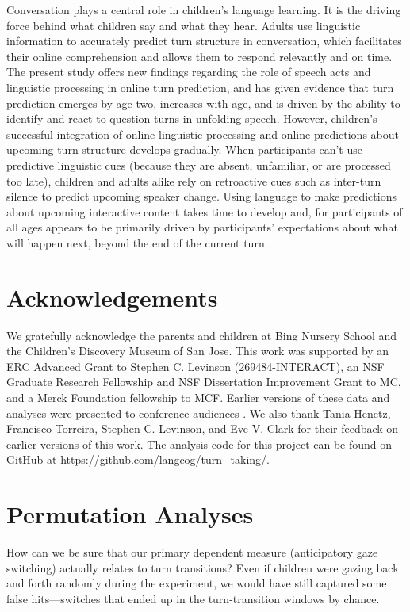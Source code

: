 \documentclass[authoryear, 12pt]{elsarticle}
\begin{document}
Conversation plays a central role in children's language learning. It is the driving force behind what children say and what they hear. Adults use linguistic information to accurately predict turn structure in conversation, which facilitates their online comprehension and allows them to respond relevantly and on time. The present study offers new findings regarding the role of speech acts and linguistic processing in online turn prediction, and has given evidence that turn prediction emerges by age two, increases with age, and is driven by the ability to identify and react to question turns in unfolding speech. However, children's successful integration of online linguistic processing and online predictions about upcoming turn structure develops gradually. When participants can't use predictive linguistic cues (because they are absent, unfamiliar, or are processed too late), children and adults alike rely on retroactive cues such as inter-turn silence to predict upcoming speaker change. Using language to make predictions about upcoming interactive content takes time to develop and, for participants of all ages appears to be primarily driven by participants' expectations about what will happen next, beyond the end of the current turn.

\section*{Acknowledgements}

We gratefully acknowledge the parents and children at Bing Nursery School and the Children's Discovery Museum of San Jose. This work was supported by an ERC Advanced Grant to Stephen C. Levinson (269484-INTERACT), an NSF Graduate Research Fellowship and NSF Dissertation Improvement Grant to MC, and a Merck Foundation fellowship to MCF. Earlier versions of these data and analyses were presented to conference audiences \citep{casillas2012, casillas2013}. We also thank Tania Henetz, Francisco Torreira, Stephen C. Levinson, and Eve V. Clark for their feedback on earlier versions of this work. The analysis code for this project can be found on GitHub at https://github.com/langcog/turn\_taking/.



\clearpage

\appendix

\section{Permutation Analyses}
\label{sec:permutation}
\setcounter{figure}{0}
\setcounter{table}{0}
How can we be sure that our primary dependent measure (anticipatory gaze switching) actually relates to turn transitions? Even if children were gazing back and forth randomly during the experiment, we would have still captured some false hits---switches that ended up in the turn-transition windows by chance.
\end{document}
